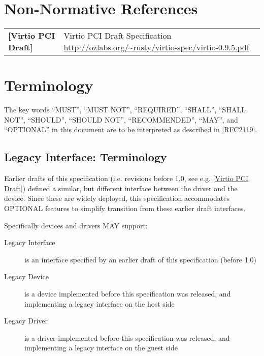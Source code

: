 \section{Non-Normative References}

\begin{longtable}{l p{5in}}
	\label{intro:Virtio PCI Draft}\textbf{[Virtio PCI Draft]} &
	Virtio PCI Draft Specification
	\newline\url{http://ozlabs.org/~rusty/virtio-spec/virtio-0.9.5.pdf}\\
\end{longtable}

\section{Terminology}\label{Terminology}

The key words ``MUST'', ``MUST NOT'', ``REQUIRED'', ``SHALL'', ``SHALL NOT'', ``SHOULD'', ``SHOULD NOT'', ``RECOMMENDED'', ``MAY'', and ``OPTIONAL'' in this document are to be interpreted as described in \hyperref[intro:rfc2119]{[RFC2119]}.

\subsection{Legacy Interface: Terminology}\label{intro:Legacy
Interface: Terminology}

Earlier drafts of this specification (i.e. revisions before 1.0,
see e.g. \hyperref[intro:Virtio PCI Draft]{[Virtio PCI Draft]})
defined a similar, but different
interface between the driver and the device.
Since these are widely deployed, this specification
accommodates OPTIONAL features to simplify transition
from these earlier draft interfaces.

Specifically devices and drivers MAY support:
\begin{description}
\item[Legacy Interface]
        is an interface specified by an earlier draft of this specification
        (before 1.0)
\item[Legacy Device]
        is a device implemented before this specification was released,
        and implementing a legacy interface on the host side
\item[Legacy Driver]
        is a driver implemented before this specification was released,
        and implementing a legacy interface on the guest side
\end{description}

